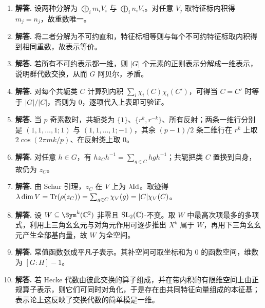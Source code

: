 \begin{enumerate}[label=\textbf{\arabic*.}, leftmargin=*, itemsep=1em]
\item \textbf{解答.} 设两种分解为 $\bigoplus_i m_iV_i$ 与 $\bigoplus_i n_iV_i$。对任意 $V_j$ 取特征标内积得 $m_j=n_j$，故重数唯一。
\item \textbf{解答.} 将二者分解为不可约直和，特征标相等则与每个不可约特征标取内积得到相同重数，故表示等价。
\item \textbf{解答.} 若所有不可约表示都一维，则 $|G|$ 个元素的正则表示分解成一维表示，说明群代数交换，从而 $G$ 阿贝尔，矛盾。
\item \textbf{解答.} 对每个共轭类 $C$ 计算列内积 $\sum_i \chi_i(C)\overline{\chi_i(C')}$，可得当 $C=C'$ 时等于 $|G|/|C|$，否则为 $0$，逐项代入上表即可验证。
\item \textbf{解答.} 当 $p$ 奇素数时，共轭类为 $\{1\}$、$\{r^k,r^{-k}\}$、所有反射；两条一维行分别是 $(1,1,\dots,1;1)$ 与 $(1,1,\dots,1;-1)$，其余 $(p-1)/2$ 条二维行在 $r^k$ 上取 $2\cos(2\pi mk/p)$、在反射类上取 $0$。
\item \textbf{解答.} 对任意 $h\in G$，有 $hz_Ch^{-1}=\sum_{g\in C} hgh^{-1}$；共轭把类 $C$ 置换到自身，故仍为 $z_C$。
\item \textbf{解答.} 由 Schur 引理，$z_C$ 在 $V$ 上为 $\lambda\mathrm{Id}$。取迹得 $\lambda\dim V=\mathrm{Tr}(\rho(z_C))=\sum_{g\in C}\chi_V(g)=|C|\chi_V(C)$。
\item \textbf{解答.} 设 $W\subseteq \Sym^k(\C^2)$ 非零且 $\mathrm{SL}_2(\mathbb{C})$-不变。取 $W$ 中最高次项最多的多项式，利用上三角幺幺元与对角元作用可逐步推出 $X^k$ 属于 $W$，再用下三角幺幺元产生全部基向量，故 $W$ 为全空间。
\item \textbf{解答.} 常值函数张成平凡子表示。其补空间可取坐标和为 $0$ 的函数空间，维数为 $[G:H]-1$。
\item \textbf{解答.} 若 Hecke 代数由彼此交换的算子组成，并在带内积的有限维空间上由正规算子表示，则它们可同时对角化，于是存在由共同特征向量组成的本征基；表示论上这反映了交换代数的简单模是一维。
\end{enumerate}
